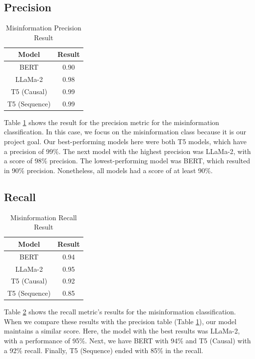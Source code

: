 \subsection{Precision}
\begin{table}[H]
	\centering
	\caption{Misinformation Precision Result}
	\begin{tabular}{||c | c||} 
		\hline
		\textbf{Model} & \textbf{Result} \\ [0.5ex] 
		\hline
		BERT & 0.90  \\
		\hline
		LLaMa-2 & 0.98 \\ 
		\hline
		T5 (Causal) & 0.99 \\
		\hline
		T5 (Sequence) & 0.99 \\
		\hline
	\end{tabular}
	\label{table:MisinformationPrecision}
\end{table}

Table \ref{table:MisinformationPrecision} shows the result for the precision metric for the misinformation classification. In this case, we focus on the misinformation
class because it is our project goal. Our best-performing models here were both T5 models, which have a precision of 99\%. The next model with the highest precision
was LLaMa-2, with a score of 98\% precision. The lowest-performing model was BERT, which resulted in 90\% precision. Nonetheless, all models had a score of at least 90\%.


\subsection{Recall}
\begin{table}[H]
	\centering
	\caption{Misinformation Recall Result}
	\begin{tabular}{||c | c||} 
		\hline
		\textbf{Model} & \textbf{Result} \\ [0.5ex] 
		\hline
		BERT & 0.94  \\
		\hline
		LLaMa-2 & 0.95 \\ 
		\hline
		T5 (Causal) & 0.92 \\
		\hline
		T5 (Sequence) & 0.85 \\
		\hline
	\end{tabular}
	\label{table:MisinformationRecall}
\end{table}

Table \ref{table:MisinformationRecall} shows the recall metric's results for the misinformation classification. When we compare these results with the precision table 
(Table \ref{table:MisinformationPrecision}), our model maintains a similar score. Here, the model with the best results was LLaMa-2, with a performance of 95\%.
Next, we have BERT with 94\% and T5 (Causal) with a 92\% recall. Finally, T5 (Sequence) ended with 85\% in the recall.


